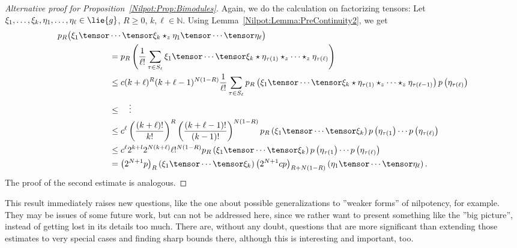 \begin{proof}[Alternative proof for Proposition~\ref{Nilpot:Prop:Bimodules}]
	Again, we do the calculation on factorizing tensors: Let 
	$\xi_1, \ldots, \xi_k, \eta_1, \ldots, \eta_\ell \in \lie{g}$, $R \geq 0$, $k, 
	\ell \in \mathbb{N}$. Using Lemma~\ref{Nilpot:Lemma:PreContinuity2}, we get
	\begin{align*}
		p_R \big(
			\xi_1 \tensor
		&			
			\cdots \tensor \xi_k
			\star_z
			\eta_1 \tensor \cdots \tensor \eta_\ell
		\big)
		\\
		&=
		p_R \left(
			\frac{1}{\ell!}
			\sum\limits_{\tau \in S_\ell}
			\xi_1 \tensor \cdots \tensor \xi_k
			\star
			\eta_{\tau(1)} \star_z \cdots \star_z \eta_{\tau(\ell)}
		\right)
		\\
		& \leq
		c (k + \ell)^R
		(k + \ell - 1)^{N (1-R)}
		\frac{1}{\ell!}
		\sum\limits_{\tau \in S_\ell}
		p_R \left(
			\xi_1 \tensor \cdots \tensor \xi_k
			\star
			\eta_{\tau(1)} \star_z \cdots \star_z \eta_{\tau(\ell-1)}
		\right)
		p\left( \eta_{\tau(\ell)} \right)
		\\
		& \leq
		\quad \vdots
		\\
		& \leq
		c^{\ell}
		\left(
			\frac{(k + \ell)!}{k!}
		\right)^R
		\left(
			\frac{(k + \ell - 1)!}{(k - 1)!}
		\right)^{N (1-R)}
		p_R \left(
			\xi_1 \tensor \cdots \tensor \xi_k
		\right)
		p\left( \eta_{\tau(1} \right)
		\cdots
		p\left( \eta_{\tau(\ell)} \right)
		\\
		& \leq
		c^{\ell}
		2^{k + l} 2^{N (k + \ell)}
		\ell!^{N (1-R)}
		p_R \left(
			\xi_1 \tensor \cdots \tensor \xi_k
		\right)
		p\left( \eta_{\tau(1} \right)
		\cdots
		p\left( \eta_{\tau(\ell)} \right)
		\\
		& =
		\left(2^{N + 1} p\right)_R 
		\left(
			\xi_1 \tensor \cdots \tensor \xi_k
		\right)
		\left(2^{N + 1} c p\right)_{R + N(1-R)}
		\left(
			\eta_1 \tensor \cdots \tensor \eta_\ell
		\right).
	\end{align*}
	The proof of the second estimate is analogous.
\end{proof}
\begin{remark}
	This result immediately raises new questions, like the one about possible 
	generalizations to ''weaker forms'' of nilpotency, for example. They may be 
	issues of some future work, but can not
	be addressed here, since we rather want to present something like  
	the ''big picture'', instead of getting 
	lost in its details too much. There are, without any doubt, questions that 
	are more significant than extending those estimates to very special cases 
	and 	finding sharp bounds there, although this is interesting and 
	important, 
	too.
\end{remark}
